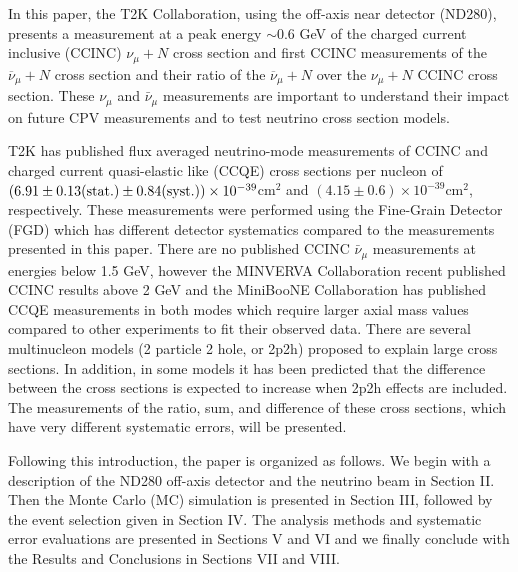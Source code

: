 In this paper, the T2K Collaboration, using the off-axis near detector (ND280), presents
a measurement at a peak energy %
$\sim$0.6 GeV of the %
charged current inclusive (CCINC)
$\nu_{\mu}+N$ cross section and first CCINC
measurements of the $\overline{\nu}_{\mu}+N$ cross section and
their ratio of the  $\overline{\nu}_{\mu}+N$ over the $\nu_{\mu}+N$
CCINC cross section.
These $\nu_{\mu}$  and $\bar\nu_{\mu}$ measurements 
are important to understand their
impact on future CPV measurements and to 
test neutrino cross section models.

T2K has published flux averaged neutrino-mode  measurements  of CCINC \citep{t2k-carbon-ccinc}
and charged current quasi-elastic like (CCQE) \citep{t2k-cceq}
cross sections per nucleon of  
 $(6.91\pm0.13{\rm (stat.)}\pm0.84{\rm (syst.)}) \times 10^{-39}$cm$^2$ 
and $(4.15\pm0.6) \times 10^{-39}$cm$^2$, 
respectively. These measurements were performed using the
Fine-Grain Detector (FGD) which has different detector systematics
compared to the measurements presented in this paper.
There are no published CCINC $\bar\nu_{\mu}$
measurements at
energies below 1.5 GeV, however
the MINVERVA Collaboration recent published \citep{minerva+nu+antinu}
CCINC results above 2 GeV
and
the MiniBooNE Collaboration has published \citep{miniboone} CCQE
measurements in both 
\nubarandnu
modes which require
larger axial mass values compared to other experiments to fit their observed data. There are several
multinucleon models (2 particle 2 hole, or 2p2h)
 \citep{martini-1,nieves-1,martini-2} proposed to explain large cross sections.
In addition, in some models it has been predicted \citep{martini-1} that the difference between the 
\nuandnubar 
cross sections is expected to increase when 
2p2h effects \citep{2p2h-refs}
are included. The measurements of the ratio, sum, and difference of these cross sections,  which
have very different systematic errors, will be presented.

Following this introduction, the paper is organized as follows. We
begin with a description of the ND280 off-axis detector and the neutrino
beam in Section II. Then the Monte Carlo (MC) simulation is presented in
Section III, followed by the event selection given in Section IV.
The analysis methods and systematic error evaluations are presented
in Sections V and VI and we finally conclude with the Results and
Conclusions in Sections VII and VIII.


